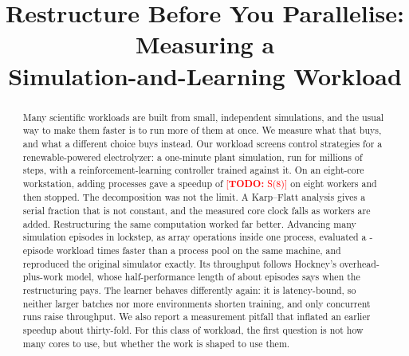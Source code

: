 \documentclass[conference]{IEEEtran}
\newif\ifanon
\newcommand{\TODO}[1]{\textcolor{red}{[\textbf{TODO:} #1]}}
\providecommand{\NumSpeedEight}{\TODO{S(8)}}
\begin{document}
\title{Restructure Before You Parallelise: Measuring a\\
Simulation-and-Learning Workload}

\ifanon
\author{\IEEEauthorblockN{Anonymous authors}
\IEEEauthorblockA{Anonymous affiliation}}
\else
\author{
\and
{}
}
\fi

\maketitle
\thispagestyle{fancy}

\begin{abstract}
Many scientific workloads are built from small, independent simulations, and the usual way to make them faster is
to run more of them at once. We measure what that buys, and what a different choice buys instead. Our workload
screens control strategies for a renewable-powered electrolyzer: a one-minute plant simulation, run for millions of
steps, with a reinforcement-learning controller trained against it. On an eight-core workstation, adding processes
gave a speedup of \NumSpeedEight{} on eight workers and then stopped. The decomposition was not the limit. A
Karp--Flatt analysis gives a serial fraction that is not constant, and the measured core clock falls as workers are
added. Restructuring the same computation worked far better. Advancing many simulation episodes in lockstep, as
array operations inside one process, evaluated a \NumBatchGridEpisodes{}-episode workload \NumBatchGridSpeedup{}
times faster than a process pool on the same machine, and reproduced the original simulator exactly. Its throughput
follows Hockney's overhead-plus-work model, whose half-performance length of about \NumBatchNHalf{} episodes says
when the restructuring pays. The learner behaves differently again: it is latency-bound, so neither larger batches
nor more environments shorten training, and only concurrent runs raise throughput. We also report a measurement
pitfall that inflated an earlier speedup about thirty-fold. For this class of workload, the first question is not
how many cores to use, but whether the work is shaped to use them.
\end{abstract}
\end{document}
